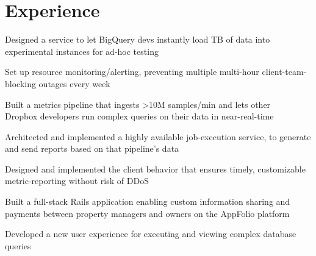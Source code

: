\section{Experience}

\vspace{\topsep} %
\begin{tightemize}
\item Designed a service to let BigQuery devs instantly load TB of data into experimental instances for ad-hoc testing
\item Set up resource monitoring/alerting, preventing multiple multi-hour client-team-blocking outages every week
\end{tightemize}
\sectionsep

\begin{tightemize}
\item Built a metrics pipeline that ingests >10M samples/min and lets other \\ Dropbox developers run complex queries on their data in near-real-time
\item Architected and implemented a highly available job-execution service, to generate and send reports based on that pipeline's data
\item Designed and implemented the client behavior that ensures timely, customizable metric-reporting without risk of DDoS
\end{tightemize}
\sectionsep

\begin{tightemize}
\item Built a full-stack Rails application enabling custom information sharing and payments between property managers and owners on the AppFolio platform
\item Developed a new user experience for executing and viewing complex database queries
\end{tightemize}
\sectionsep
%
%
